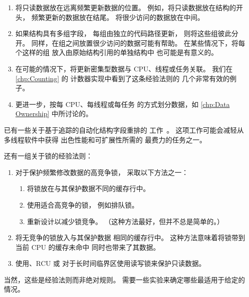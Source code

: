 \begin{enumerate}
\item	将只读数据放在远离频繁更新数据的位置。
	例如，将只读数据放在结构的开头，
	频繁更新的数据放在结尾。
	将很少访问的数据放在中间。
\item	如果结构具有多组字段，
	每组由独立的代码路径更新，
	则将这些组彼此分开。
	同样，在组之间放置很少访问的数据可能有帮助。
	在某些情况下，将每个这样的组
	放入由原始结构引用的单独结构中
	也可能是有意义的。
\item	在可能的情况下，将更新密集型数据与
	CPU、线程或任务关联。
	我们在 \cref{chp:Counting} 的
	计数器实现中看到了这条经验法则的
	几个非常有效的例子。
\item	更进一步，按每 CPU、每线程或每任务
	的方式划分数据，如
	\cref{chp:Data Ownership} 中所讨论的。
\end{enumerate}

已有一些关于基于追踪的自动化结构字段重排的
工作~\cite{Golovanevsky:2010:TDL:2174824.2174835}。
这项工作可能会减轻从多线程软件中获得
出色性能和可扩展性所需的
最费力的任务之一。

还有一组关于锁的经验法则：

\begin{enumerate}
\item	对于保护频繁修改数据的高竞争锁，
	采取以下方法之一：
	\begin{enumerate}
	\item	将锁放在与其保护数据不同的缓存行中。
	\item	使用适合高竞争的锁，
		例如排队锁。
	\item	重新设计以减少锁竞争。
		（这种方法最好，但并不总是简单的。）
	\end{enumerate}
\item	将无竞争的锁放入与其保护数据
	相同的缓存行中。
	这种方法意味着将锁带到当前 CPU 的缓存未命中
	同时也带来了其数据。
\item	使用、RCU 或
	对于长时间临界区使用读写锁来保护只读数据。
\end{enumerate}

当然，这些是经验法则而非绝对规则。
需要一些实验来确定哪些最适用于给定的情况。
